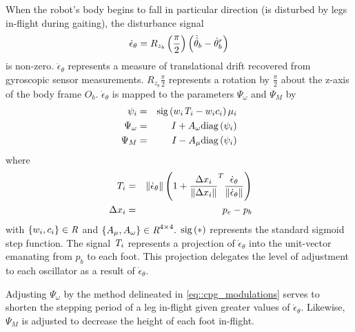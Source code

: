 			When the robot's body begins to fall in particular direction (\IE is disturbed by legs in-flight during gaiting), the disturbance signal 
		\begin{equation}
			\dot{\epsilon}_{\theta} = {R}_{z_{b}}\left(\frac{\pi}{2}\right)\left(\dot{\hat{\theta}}_{b} - \dot{\theta}_{b}^{r}\right)
		\end{equation}
			is non-zero. $\dot{\epsilon}_{\theta}$ represents a measure of translational drift recovered from gyroscopic sensor measurements. ${R}_{z_{b}}{\frac{\pi}{2}}$ represents a rotation by $\frac{\pi}{2}$ about the z-axis of the body frame $O_{b}$. $\dot{\epsilon}_{\theta}$ is mapped to the parameters $\Psi_{\omega}$ and $\Psi_{M}$ by
				\begin{eqnarray}
					\psi_{i} 			&=& \text{sig}\left(  w_{i} \emph{T}_{i} - w_{i} c_{i} \right) {\mu}_{i} 	\nonumber\\
					\Psi_{\omega} 		&=& I + A_{\omega}\text{diag}\left( \psi_{i} \right) 						\nonumber\\
					\Psi_{M}			&=& I - A_{\mu} \text{diag}\left(  \psi_{i} \right) 
					\label{eq::cpg_modulations}
				\end{eqnarray}
			where
				\begin{eqnarray}
					\emph{T}_{i} 		&=& \left\lVert \dot{\epsilon}_{\theta} \right\rVert \left(1 + \frac{\Delta x_{i}}{\left\lVert\Delta x_{i}\right\rVert}^T  \frac{ \dot{\epsilon}_{\theta}  }{\left\lVert \dot{\epsilon}_{\theta}  \right\rVert} \right)	\nonumber\\\
					\Delta x_{i}		&=& {p}_{e} - {p}_{b}
				\end{eqnarray}
			with $\{w_{i}, c_{i}\} \in\emph{R}^{}$ and $\{A_{\mu}, A_{\omega}\}   \in\emph{R}^{4\times4}.$ $\text{sig}\left(*\right)$ represents the standard
			sigmoid step function. The signal $\emph{T}_{i}$ represents a projection of $\dot{\epsilon}_{\theta}$ into the unit-vector emanating from ${p}_{b}$ to each \Ith foot. This projection delegates the level of adjustment to each \Ith oscillator as a result of $\dot{\epsilon}_{\theta}$. 		

			Adjusting $\Psi_{\omega}$ by the method delineated in \ref{eq::cpg_modulations} serves to shorten the stepping period of a leg in-flight given greater values of $\dot{\epsilon}_{\theta}$. Likewise, $\Psi_{M}$ is adjusted to decrease the height of each foot in-flight. 

